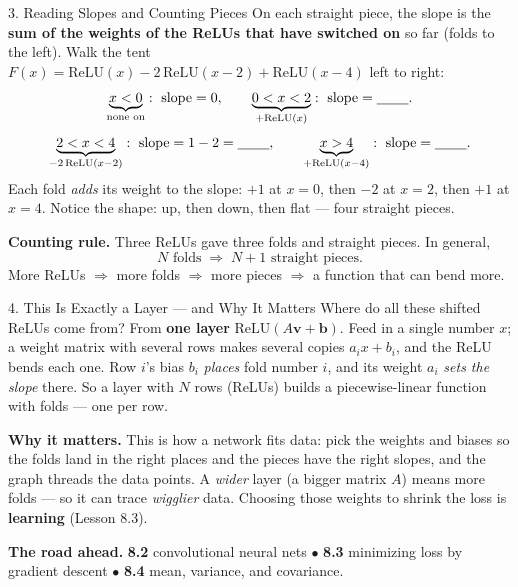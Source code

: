 \documentclass[10pt]{article}
\newcommand{\vv}{\mathbf{v}}
\newcommand{\bb}{\mathbf{b}}
\newcommand{\relu}{\mathrm{ReLU}}
\begin{document}
\begin{notesbox}{3. Reading Slopes and Counting Pieces}
On each straight piece, the slope is the \textbf{sum of the weights of the ReLUs that have switched on} so
far (folds to the left). Walk the tent $F(x)=\relu(x)-2\,\relu(x-2)+\relu(x-4)$ left to right:
\[
  \underbrace{x<0}_{\text{none on}}:\ \text{slope}=0,\qquad
  \underbrace{0<x<2}_{+\relu(x)}:\ \text{slope}=\blank{0.8cm}.
\]
\[
  \underbrace{2<x<4}_{-2\,\relu(x-2)}:\ \text{slope}=1-2=\blank{0.8cm},\qquad
  \underbrace{x>4}_{+\relu(x-4)}:\ \text{slope}=\blank{0.8cm}.
\]
Each fold \emph{adds} its weight to the slope: $+1$ at $x=0$, then $-2$ at $x=2$, then $+1$ at $x=4$. Notice
the shape: up, then down, then flat --- four straight pieces.

\vspace{2pt}
\textbf{Counting rule.} Three ReLUs gave three folds and \blank{0.9cm} straight pieces. In general,
\[
  N \text{ folds} \;\Longrightarrow\; N+1 \text{ straight pieces.}
\]
More ReLUs $\Rightarrow$ more folds $\Rightarrow$ more pieces $\Rightarrow$ a function that can bend more.
\end{notesbox}

\begin{notesbox}{4. This Is Exactly a Layer --- and Why It Matters}
Where do all these shifted ReLUs come from? From \textbf{one layer} $\relu(A\vv+\bb)$. Feed in a single
number $x$; a weight matrix with several rows makes several copies $a_i x + b_i$, and the ReLU bends each
one. Row $i$'s bias $b_i$ \emph{places} fold number $i$, and its weight $a_i$ \emph{sets the slope} there.
So a layer with $N$ rows (ReLUs) builds a piecewise-linear function with \blank{1.6cm} folds --- one per row.

\vspace{2pt}
\textbf{Why it matters.} This is how a network fits data: pick the weights and biases so the folds land in
the right places and the pieces have the right slopes, and the graph threads the data points. A \emph{wider}
layer (a bigger matrix $A$) means more folds --- so it can trace \emph{wigglier} data. Choosing those
weights to shrink the loss is \textbf{learning} (Lesson 8.3).

\vspace{2pt}
\textbf{The road ahead.} \textbf{8.2} convolutional neural nets\; $\bullet$\; \textbf{8.3} minimizing loss
by gradient descent\; $\bullet$\; \textbf{8.4} mean, variance, and covariance.
\end{notesbox}
\end{document}
